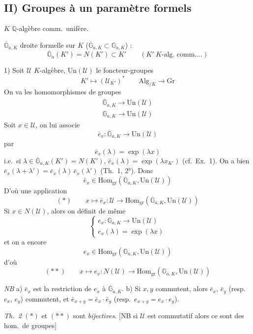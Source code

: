 \documentclass[11pt,a4paper]{article}
\begin{document}
\subsection*{II) Groupes à un paramètre formels}

$K$ $\mathbb{Q}$-algèbre comm.\ unifère.

$\overline{\mathbb{G}}_{a,K}$ droite formelle sur $K$
($\overline{\mathbb{G}}_{a,K} \subset \mathbb{G}_{a,K}$) :
\[
\overline{\mathbb{G}}_{a}(K') = N(K') \subset K' \qquad (K' \ K\text{-alg.\ comm.} \dots)
\]

1) Soit $\mathcal{U}$ $K$-algèbre, $\mathrm{Un}(\mathcal{U})$ le
foncteur-groupes
\[
K' \mapsto (\mathcal{U}_{K'})^{*} \qquad \mathrm{Alg}_{/K} \to \mathrm{Gr}
\]
On va  les homomorphismes de groupes
\[
\begin{array}{l}
\overline{\mathbb{G}}_{a,K} \to \mathrm{Un}(\mathcal{U}) \\
\mathbb{G}_{a,K} \to \mathrm{Un}(\mathcal{U})
\end{array}
\]
Soit $x \in \mathcal{U}$, on lui associe
\[
\bar e_x : \overline{\mathbb{G}}_{a,K} \to \mathrm{Un}(\mathcal{U})
\]
par
\[
\bar e_x(\lambda) = \exp(\lambda x)
\]
i.e.\ si $\lambda \in \overline{\mathbb{G}}_{a,K}(K') = N(K')$,
$\bar e_x(\lambda) = \exp(\lambda x_{K'})$ (cf.\ Ex.~1). On a bien
$\bar e_x(\lambda + \lambda') = \bar e_x(\lambda)\, \bar e_x(\lambda')$
(Th.~1, 2°). Donc
\[
\bar e_x \in \mathrm{Hom}_{\mathrm{gr}}(\overline{\mathbb{G}}_{a,K}, \mathrm{Un}(\mathcal{U}))
\]
D'où une application
\[
(*) \qquad x \mapsto \bar e_x : \mathcal{U} \to \mathrm{Hom}_{\mathrm{gr}}(\overline{\mathbb{G}}_{a,K}, \mathrm{Un}(\mathcal{U}))
\]
Si $x \in N(\mathcal{U})$, alors on définit de même
\[
\begin{cases}
e_x : \mathbb{G}_{a,K} \to \mathrm{Un}(\mathcal{U}) \\
e_x(\lambda) = \exp(\lambda x)
\end{cases}
\]
et on a encore
\[
e_x \in \mathrm{Hom}_{\mathrm{gr}}(\mathbb{G}_{a,K}, \mathrm{Un}(\mathcal{U}))
\]
d'où
\[
(**) \qquad x \mapsto e_x : N(\mathcal{U}) \to \mathrm{Hom}_{\mathrm{gr}}(\mathbb{G}_{a,K}, \mathrm{Un}(\mathcal{U}))
\]

\emph{NB} a) $\bar e_x$ est la restriction de $e_x$ à
$\overline{\mathbb{G}}_{a,K}$. b) Si $x, y$ commutent, alors $\bar e_x$,
$\bar e_y$ (resp.\ $e_x$, $e_y$) commutent, et
$\bar e_{x+y} = \bar e_x \cdot \bar e_y$ (resp.\
$e_{x+y} = e_x \cdot e_y$).

\emph{Th.~2} $(*)$ et $(**)$ sont \emph{bijectives}. [NB si $\mathcal{U}$ est
commutatif alors ce sont des hom.\ de groupes]
\end{document}

